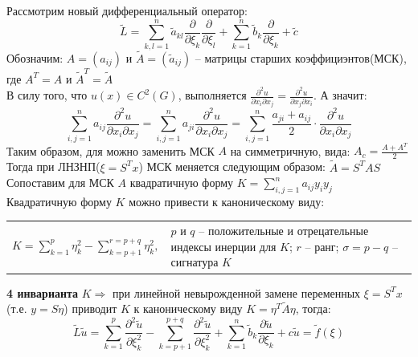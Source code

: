 Рассмотрим новый дифференциальный оператор:\\
$$\tilde{L}=\sum_{k,l=1}^{n} \tilde{a}_{kl}\frac{\partial}{\partial \xi_k} \frac{\partial}{\partial \xi_l}
	+\sum_{k=1}^{n} \tilde{b}_{k}\frac{\partial }{\partial \xi_k} + \tilde{c}$$
Обозначим: $A = (a_{ij})$ и $\tilde{A} = (\tilde{a}_{ij})$ -- матрицы старших коэффициэнтов(МСК), где $A^T=A$ и $\tilde{A}^T=\tilde{A}$\\
В силу того, что $\displaystyle u(x)\in C^2(G)$, выполняется $\displaystyle \frac{\partial^2 u}{\partial x_i \partial x_j}= \frac{\partial^2 u}{\partial x_j \partial x_i}$. А значит:
$$\sum_{i,j=1}^{n} a_{ij}\frac{\partial^2 u}{\partial x_i\partial x_j}=
	\sum_{i,j=1}^{n} a_{ji}\frac{\partial^2 u}{\partial x_i\partial x_j}=
	\sum_{i,j=1}^{n} \frac{a_{ji}+a_{ij}}{2}\cdot\frac{\partial^2 u}{\partial x_i\partial x_j}$$
Таким образом, для \LDUChPSPPK{} можно заменить МСК $A$ на симметричную, вида: $\displaystyle A_c=\frac{A+A^T}{2}$ \\
Тогда при ЛНЗНП($\displaystyle\xi=S^T x$) МСК меняется следующим образом: $\displaystyle\tilde{A}=S^T A S$\\
Сопоставим для МСК $A$ квадратичную форму $K=\sum_{i,j=1}^n a_{ij}y_i y_j$\\
Квадратичную форму $K$ можно привести к каноническому виду:\\
\begin{tabular}{p{} p{}}
	\hspace{1cm}\(\displaystyle
	K=\sum_{k=1}^{p}\eta^2_k-\sum_{k=p+1}^{r=p+q}\eta^2_k,
	\) &
	$p$ и $q$ -- положительные и отрецательные индексы инерции для $K$; $r$ -- ранг; $\sigma=p-q$ -- сигнатура $K$
\end{tabular}
\textbf{4 инварианта} $K\Longrightarrow$ при линейной невырожденной замене переменных $\xi = S^T x$ (т.е. $ y=S\eta $) приводит $K$  к каноническому виду $\displaystyle K = \eta^T \tilde{A} \eta$, тогда:
$$
	\tilde{L} \tilde{u} =
	\sum^p_{k=1}\frac{\partial^2\tilde u}{\partial \xi^2_k} -
	\sum^{p+q}_{k=p+1}\frac{\partial^2\tilde u}{\partial \xi^2_k} +
	\sum^{n}_{k=1} \tilde{b}_{k}\frac{\partial\tilde u}{\partial \xi_k} + c \tilde u = \tilde f(\xi)
$$
